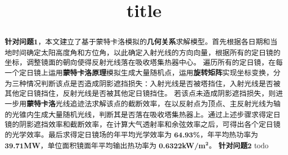 \documentclass{myclass}
\title{title}
\begin{document}
\begin{abstract}
\textbf{针对问题1}，本文建立了基于蒙特卡洛模拟的\textbf{几何关系}求解模型。首先根据各日期和当地时间确定太阳高度角和方位角，以此确定入射光线的方向向量，根据所有的定日镜的坐标，调整镜面的朝向使得反射光线落在吸收塔集热器中心。
遍历所有的定日镜，在每一个定日镜上运用\textbf{蒙特卡洛原理}模拟生成大量随机点，运用\textbf{旋转矩阵}实现坐标变换，分为三种情况判断该点是否造成阴影遮挡损失：入射光线是否被塔挡住，入射光线是否被其他定日镜挡住，反射光线是否被其他定日镜挡住。
若该点未造成阴影遮挡损失，则进一步用\textbf{蒙特卡洛}光线追迹法求解该点的截断效率，在以反射点为顶点、主反射光线为轴的光锥内生成大量随机光线，判断其是否落在吸收塔集热器上。通过上述步骤求得定日镜的阴影遮挡效率和截断效率，在计算大气透射率和余弦效率之后，可得出各个定日镜的光学效率。最后求得定日镜场的年平均光学效率为 \textbf{64.93\%}，年平均热功率为 \textbf{39.71MW}，单位面积镜面年平均输出热功率为 \textbf{0.6322kW/m}\({}^{\mathbf{2}}\)。
\textbf{针对问题2}
todo
\end{abstract}








\end{document}
